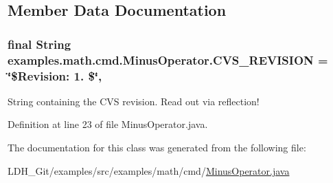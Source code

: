 \subsection{Member Data Documentation}
\hypertarget{classexamples_1_1math_1_1cmd_1_1_minus_operator_a9bd331952b7b40174de6e0cd58bb5e32}{
\subsubsection[{C\-V\-S\-\_\-\-R\-E\-V\-I\-S\-I\-O\-N}]{\setlength{\rightskip}{0pt plus 5cm}final String examples.\-math.\-cmd.\-Minus\-Operator.\-C\-V\-S\-\_\-\-R\-E\-V\-I\-S\-I\-O\-N = \char`\"{}\$Revision\-: 1. \$\char`\"{}\hspace{0.3cm}{\ttfamily [static]}, {\ttfamily [private]}}}\label{classexamples_1_1math_1_1cmd_1_1_minus_operator_a9bd331952b7b40174de6e0cd58bb5e32}
String containing the C\-V\-S revision. Read out via reflection! 

Definition at line 23 of file Minus\-Operator.\-java.



The documentation for this class was generated from the following file\-:\begin{DoxyCompactItemize}
\item 
L\-D\-H\-\_\-\-Git/examples/src/examples/math/cmd/\hyperlink{_minus_operator_8java}{Minus\-Operator.\-java}\end{DoxyCompactItemize}
